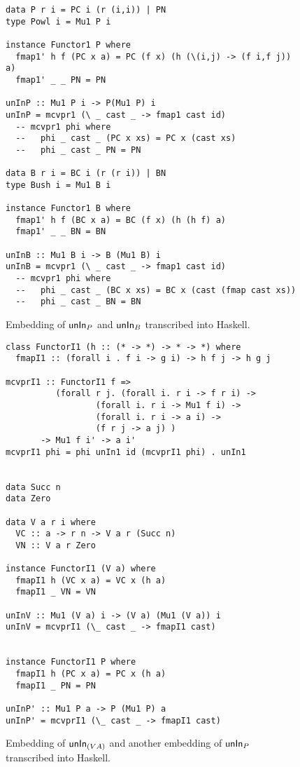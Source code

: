 \begin{figure}
\begin{singlespace}
\begin{lstlisting}
data P r i = PC i (r (i,i)) | PN
type Powl i = Mu1 P i

instance Functor1 P where
  fmap1' h f (PC x a) = PC (f x) (h (\(i,j) -> (f i,f j)) a)
  fmap1' _ _ PN = PN

unInP :: Mu1 P i -> P(Mu1 P) i
unInP = mcvpr1 (\ _ cast _ -> fmap1 cast id)
  -- mcvpr1 phi where
  --   phi _ cast _ (PC x xs) = PC x (cast xs)
  --   phi _ cast _ PN = PN

data B r i = BC i (r (r i)) | BN
type Bush i = Mu1 B i

instance Functor1 B where
  fmap1' h f (BC x a) = BC (f x) (h (h f) a)
  fmap1' _ _ BN = BN

unInB :: Mu1 B i -> B (Mu1 B) i
unInB = mcvpr1 (\ _ cast _ -> fmap1 cast id)
  -- mcvpr1 phi where
  --   phi _ cast _ (BC x xs) = BC x (cast (fmap cast xs))
  --   phi _ cast _ BN = BN
\end{lstlisting}
\end{singlespace}
\caption{Embedding of $\mathsf{unIn}_P$ and $\mathsf{unIn}_B$ transcribed into Haskell.}
\label{fig:HaskellunInNested}
\end{figure}

\begin{figure}
\begin{singlespace}
\begin{lstlisting}
class FunctorI1 (h :: (* -> *) -> * -> *) where
  fmapI1 :: (forall i . f i -> g i) -> h f j -> h g j

mcvprI1 :: FunctorI1 f =>
          (forall r j. (forall i. r i -> f r i) ->
                  (forall i. r i -> Mu1 f i) ->
                  (forall i. r i -> a i) ->
                  (f r j -> a j) )
       -> Mu1 f i' -> a i'
mcvprI1 phi = phi unIn1 id (mcvprI1 phi) . unIn1


data Succ n
data Zero

data V a r i where
  VC :: a -> r n -> V a r (Succ n)
  VN :: V a r Zero

instance FunctorI1 (V a) where
  fmapI1 h (VC x a) = VC x (h a)
  fmapI1 _ VN = VN

unInV :: Mu1 (V a) i -> (V a) (Mu1 (V a)) i
unInV = mcvprI1 (\_ cast _ -> fmapI1 cast)


instance FunctorI1 P where
  fmapI1 h (PC x a) = PC x (h a)
  fmapI1 _ PN = PN

unInP' :: Mu1 P a -> P (Mu1 P) a
unInP' = mcvprI1 (\_ cast _ -> fmapI1 cast)
\end{lstlisting}
\end{singlespace}
\caption{Embedding of $\mathsf{unIn}_{(V A)}$ and
	another embedding of $\mathsf{unIn}_P$\\ transcribed into Haskell.}
\label{fig:HaskellunInIndexed}
\end{figure}

